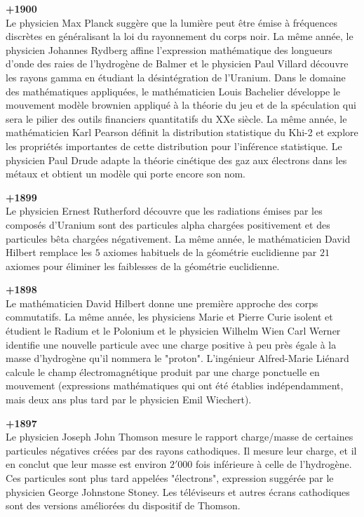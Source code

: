 \textbf{+1900}\\
Le physicien Max Planck suggère que la lumière peut être émise à fréquences discrètes en généralisant la loi du rayonnement du corps noir. La même année, le physicien Johannes Rydberg affine l'expression mathématique des longueurs d'onde des raies de l'hydrogène de Balmer et le physicien Paul Villard découvre les rayons gamma en étudiant la désintégration de l'Uranium. Dans le domaine des mathématiques appliquées, le mathématicien Louis Bachelier développe le mouvement modèle brownien appliqué à la théorie du jeu et de la spéculation qui sera le pilier des outils financiers quantitatifs du XXe siècle. La même année, le mathématicien Karl Pearson définit la distribution statistique du Khi-2 et explore les propriétés importantes de cette distribution pour l'inférence statistique. Le physicien Paul Drude adapte la théorie cinétique des gaz aux électrons dans les métaux et obtient un modèle qui porte encore son nom.

\textbf{+1899}\\
Le physicien Ernest Rutherford découvre que les radiations émises par les composés d'Uranium sont des particules alpha chargées positivement et des particules bêta chargées négativement. La même année, le mathématicien David Hilbert remplace les $5$ axiomes habituels de la géométrie euclidienne par $21$ axiomes pour éliminer les faiblesses de la géométrie euclidienne.

\textbf{+1898}\\
Le mathématicien David Hilbert donne une première approche des corps commutatifs. La même année, les physiciens Marie et Pierre Curie isolent et étudient le Radium et le Polonium et le physicien Wilhelm Wien Carl Werner identifie une nouvelle particule avec une charge positive à peu près égale à la masse d'hydrogène qu'il nommera le "proton". L'ingénieur Alfred-Marie Liénard calcule le champ électromagnétique produit par une charge ponctuelle en mouvement (expressions mathématiques qui ont été établies indépendamment, mais deux ans plus tard par le physicien Emil Wiechert).

\textbf{+1897}\\
Le physicien Joseph John Thomson mesure le rapport charge/masse de certaines particules négatives créées par des rayons cathodiques. Il mesure leur charge, et il en conclut que leur masse est environ $2'000$ fois inférieure à celle de l'hydrogène. Ces particules sont plus tard appelées "électrons", expression suggérée par le physicien George Johnstone Stoney. Les téléviseurs et autres écrans cathodiques sont des versions améliorées du dispositif de Thomson.

